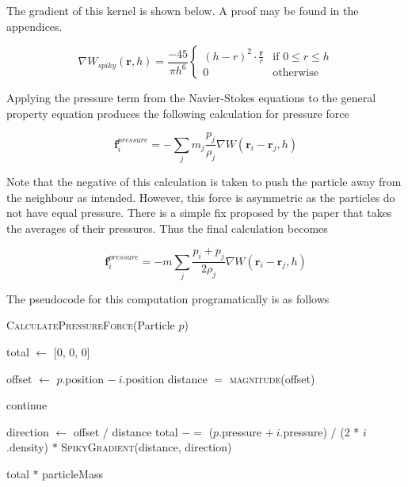 \documentclass[12pt]{article}
\begin{document}
    The gradient of this kernel is shown below\cite{spikygrad}. A proof may be found in the appendices.

    \begin{equation}
        \nabla W_{spiky}(\textbf{r}, h) = \frac{-45}{\pi{h}^6}
        \begin{cases}
            (h-r)^2 \cdot \frac{\textbf{r}}{r} & \text{if } 0 \leq r \leq h \\
            0 & \text{otherwise}
        \end{cases}
    \end{equation}

    Applying the pressure term from the Navier-Stokes equations to the general property equation produces the following calculation for pressure force

    \begin{equation}
        \textbf{f}^{pressure}_i = -\sum_{j}{m_j}\frac{p_j}{\rho_j}\nabla{W(\textbf{r}_i - \textbf{r}_j, h)}
    \end{equation}

    Note that the negative of this calculation is taken to push the particle away from the neighbour as intended. However, this force is asymmetric as the particles do not have equal pressure. There is a simple fix proposed by the paper that takes the averages of their pressures. Thus the final calculation becomes

    \begin{equation}
        \textbf{f}^{pressure}_i = -m\sum_{j}\frac{p_i + p_j}{2\rho_j}\nabla{W(\textbf{r}_i - \textbf{r}_j, h)}
    \end{equation}

    The pseudocode for this computation programatically is as follows

    \begin{algorithm}[H]
        \caption{\textsc{CalculatePressureForce}(Particle $p$)}
    
        \begin{algorithmic}[1]
            \State total $\gets$ [0, 0, 0]
            
                \State offset $\gets$ $p$.position $-\ i$.position
                \State distance $=$ \textsc{magnitude}(offset)

                    continue
                \EndIf

                \State direction $\gets$ offset $/$ distance
                \State total $-=$ ($p$.pressure $+\ i$.pressure) $/$ (2 * $i$.density) $*$ \textsc{SpikyGradient}(distance, direction)
            \EndFor

            \Return total $*$ particleMass
        \end{algorithmic}

    \end{algorithm}
\end{document}
